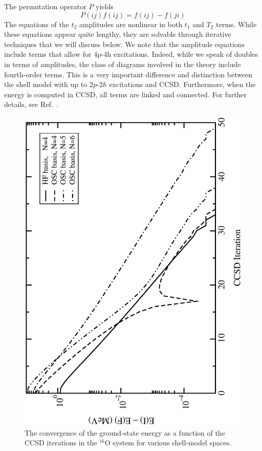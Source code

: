 \documentclass{article}
\begin{document}
The permutation operator $P$ yields
\begin{equation}
P(ij)f(ij) = f(ij) - f(ji)
\end{equation}
The equations of the $t_2$ amplitudes are nonlinear in both $t_1$ and
$T_2$ terms. While these equations appear quite lengthy, they are 
solvable through iterative techniques that we will discuss below. 
We note that the amplitude equations include terms that allow for 
4p-4h excitations. Indeed, while we speak of doubles in terms of 
amplitudes, the class of diagrams involved in the theory include 
fourth-order terms. This is a very important difference 
and distinction between the shell model with up to 
$2p$-$2h$ excitations and CCSD. Furthermore, when
the energy is computed in CCSD, all terms are linked and connected. 
For further details, see Ref.~\cite{dean03}.
\begin{figure}[ht]
\begin{center}
\includegraphics[angle=270, scale=0.5]{ccsd_converge.eps}
\caption{The convergence of the ground-state energy
as a function of the CCSD iterations in the $^{16}$O system 
for various shell-model spaces.}
\label{converge_fig}
\end{center}
\end{figure}
\end{document}
